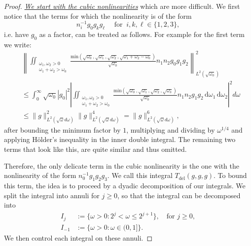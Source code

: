 \documentclass[10pt,a4paper]{amsart}
\newcommand{\dd}{{\, \mathrm d}}
\begin{document}
    \begin{proof}
        \noindent
\underline{\emph{We start with the cubic nonlinearities}} which are more difficult. 
        We first notice that the terms for which the nonlinearity is of the form $$n_i^{-1}g_0g_kg_\ell \quad \text{ for }\ i, k, \ell \in \{1,2,3\},$$
        i.e. have $g_0$ as a factor, can be treated as follows. For example for the first term we write: 
        \begin{align*}
            &\left\| \iint_{\substack{\omega_1, \omega_2>0 \\ \omega_1+\omega_2>\omega_0}}  \frac{\text{min}(\sqrt{\omega_0},\sqrt{\omega_1},\sqrt{\omega_2},\sqrt{\omega_1+\omega_2-\omega_0})}{\sqrt{\omega_0}} 
   n_1n_2 g_0g_1g_2 \right\|_{L^2(\sqrt{\omega_0})}^2 \\
   & \leq \int_0^\infty \sqrt{\omega_0} |g_0|^2 \left\vert 
   \iint_{\substack{\omega_1, \omega_2>0 \\ \omega_1+\omega_2>\omega_0}}  \frac{\text{min}(\sqrt{\omega_0},\sqrt{\omega_1},\sqrt{\omega_2},\sqrt{\omega_3})}{\sqrt{\omega_0}} n_1n_2 g_1g_2 \dd \omega_1 \dd \omega_2
   \right\vert^2 d \omega  \\
   & \leq \|g\|_{L^2(\sqrt{\omega} d\omega)}^2\|g\|_{L^2(\sqrt{\omega} d\omega)}^4 = \|g\|_{L^2(\sqrt{\omega} d\omega)}^6, \end{align*}
        after bounding the minimum factor by $1$, multiplying and dividing by $\omega^{1/4}$ and applying H\"{o}lder's inequality in the inner double integral. The remaining two terms that look like this, are quite similar and thus omitted. 
        
Therefore,  the only delicate term in the cubic nonlinearity is the one with the nonlinearity of the form $n_0^{-1} g_1g_2g_3$. We call this integral $T_{\text{del}}(g,g,g)$.  
To bound this term, the idea is to proceed by a dyadic decomposition of
our integrals. We split the integral into annuli for $j \geq 0$,
so that the integral can be decomposed into 
\begin{align*} 
 I_j &:= \{ \omega >0: 2^{j} < \omega \leq 2^{j+1}\}, \quad \text{for } j\geq 0,  \\
 I_{-1}&:= \{ \omega >0: \omega \in (0,1]\}.
\end{align*}
We then control each integral on these annuli. 


\end{proof}
\end{document}
